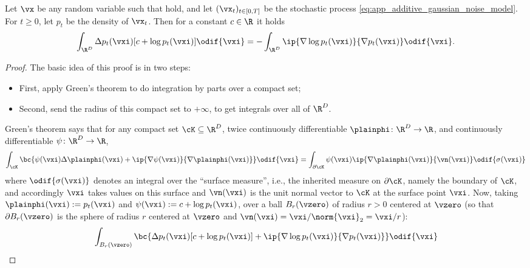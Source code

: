 \documentclass[../../book-main.tex]{subfiles}
\begin{document}
\begin{lemma}\label{lem:diffusion_ibp}
    Let \(\vx\) be any random variable such that  hold, and let \((\vx_{t})_{t \in [0, T]}\) be the stochastic process \eqref{eq:app_additive_gaussian_noise_model}. For \(t \geq 0\), let \(p_{t}\) be the density of \(\vx_{t}\). Then for a constant \(c \in \R\) it holds 
    \begin{equation}
        \int_{\R^{D}}\Delta p_{t}(\vxi)[c + \log p_{t}(\vxi)]\odif{\vxi} = -\int_{\R^{D}}\ip{\nabla \log p_{t}(\vxi)}{\nabla p_{t}(\vxi)}\odif{\vxi}.
    \end{equation}
\end{lemma}
\begin{proof}
    The basic idea of this proof is in two steps:
    \begin{itemize}
        \item First, apply Green's theorem to do integration by parts over a compact set;
        \item Second, send the radius of this compact set to \(+\infty\), to get integrals over all of \(\R^{D}\).
    \end{itemize}
    Green's theorem says that for any compact set \(\cK \subseteq \R^{D}\), twice continuously differentiable \(\plainphi \colon \R^{D} \to \R\), and continuously differentiable \(\psi \colon \R^{D} \to \R\),
    \begin{equation}
        \int_{\cK}\bc{\psi(\vxi) \Delta \plainphi(\vxi) + \ip{\nabla \psi(\vxi)}{\nabla \plainphi(\vxi)}}\odif{\vxi} = \int_{\partial \cK}\psi(\vxi)\ip{\nabla \plainphi(\vxi)}{\vn(\vxi)}\odif{\sigma(\vxi)}
    \end{equation}
    where \(\odif{\sigma(\vxi)}\) denotes an integral over the ``surface measure'', i.e., the inherited measure on \(\partial \cK\), namely the boundary of \(\cK\), and accordingly \(\vxi\) takes values on this surface and \(\vn(\vxi)\) is the unit normal vector to \(\cK\) at the surface point \(\vxi\). Now, taking \(\plainphi(\vxi) := p_{t}(\vxi)\) and \(\psi(\vxi) := c + \log p_{t}(\vxi)\), over a ball \(B_{r}(\vzero)\) of radius \(r > 0\) centered at \(\vzero\) (so that \(\partial B_{r}(\vzero)\) is the sphere of radius \(r\) centered at \(\vzero\) and \(\vn(\vxi) = \vxi/\norm{\vxi}_{2} = \vxi/r\)):
    \begin{align}
        &\int_{B_{r}(\vzero)}\bc{\Delta p_{t}(\vxi)[c + \log p_{t}(\vxi)] + \ip{\nabla \log p_{t}(\vxi)}{\nabla p_{t}(\vxi)}}\odif{\vxi} \\

\end{align}
\end{proof}
\end{document}
